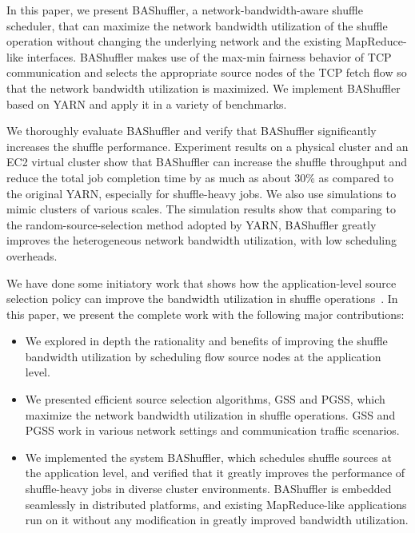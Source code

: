 \documentclass[10pt,journal,compsoc]{IEEEtran}
\begin{document}
In this paper, 
we present BAShuffler, a network-bandwidth-aware shuffle scheduler, 
that can maximize the network bandwidth utilization of the shuffle operation
without changing the underlying network and the existing MapReduce-like interfaces. 
BAShuffler 
makes use of the max-min fairness behavior of TCP communication
and selects the appropriate source nodes of the TCP fetch flow so that 
the network bandwidth utilization is maximized. 
We implement BAShuffler based on YARN and apply it in
a variety of benchmarks.

We thoroughly evaluate BAShuffler
and verify that BAShuffler significantly increases the
shuffle performance. 
Experiment results on a physical cluster and an EC2
virtual cluster show that BAShuffler can increase the
shuffle throughput
and reduce the total job completion time by as much as about 30\%
as compared to the original YARN,
especially for
shuffle-heavy jobs. 
We also use simulations to mimic clusters of various scales. 
The simulation results show that comparing to the
random-source-selection method adopted by YARN, 
BAShuffler greatly improves the heterogeneous network bandwidth
utilization, with low scheduling overheads.

We have done some initiatory work that shows how the application-level source selection policy can improve the bandwidth utilization in shuffle operations~\cite{Liang:2016:BMN}. In this paper, we present the complete work with the following major contributions:

\begin{itemize}[leftmargin=*]
\setlength{\itemsep}{0pt}
\setlength{\parskip}{0pt}
\setlength{\parsep}{0pt}
\item We explored in depth the rationality and benefits 
of improving the shuffle bandwidth utilization by scheduling flow source nodes at the application level.

\item We presented efficient source selection algorithms, GSS and PGSS,
which maximize the network bandwidth utilization in shuffle operations.
GSS and PGSS work in various network settings and communication traffic scenarios.

\item We implemented the system BAShuffler, 
which schedules shuffle sources at the application level,
and verified that it greatly improves the performance of shuffle-heavy jobs in diverse cluster environments. 
BAShuffler is embedded seamlessly in distributed platforms, 
and existing MapReduce-like applications run on it without any modification in greatly improved bandwidth utilization. 

\end{itemize}
\end{document}
